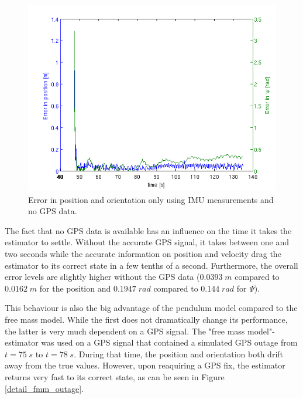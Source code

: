 \begin{figure}[hb]
\centering
\includegraphics[width=1\textwidth]{pictures/2_2_errors_noGPS.png}
\caption{Error in position and orientation only using IMU measurements and no GPS data.}
\label{error_noGPS}
\end{figure}
The fact that no GPS data is available has an influence on the time it takes the estimator to settle. Without the accurate GPS signal, it takes between one and two seconds while the accurate information on position and velocity drag the estimator to its correct state in a few tenths of a second. Furthermore, the overall error levels are slightly higher without the GPS data ($0.0393\;m$ compared to $0.0162\;m$ for the position and $0.1947\;rad$ compared to $0.144\;rad$ for $\Psi$). 

This behaviour is also the big advantage of the pendulum model compared to the free mass model. While the first does not dramatically change its performance, the latter is very much dependent on a GPS signal. The "free mass model"-estimator was used on a GPS signal that contained a simulated GPS outage from $t=75\;s$ to $t=78\;s$. During that time, the position and orientation both drift away from the true values. However, upon reaquiring a GPS fix, the estimator returns very fast to its correct state, as can be seen in Figure \ref{detail_fmm_outage}.

